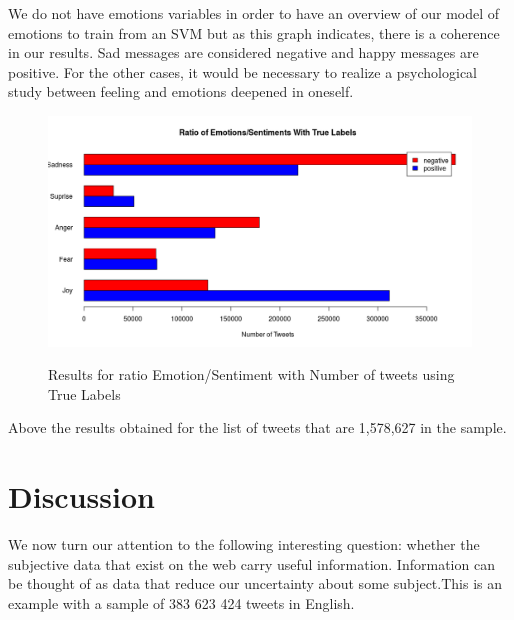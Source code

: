 \documentclass{acmtog} %
\begin{document}
\begin{itemize}
We do not have emotions variables in order to have an overview of our model of emotions to train from an SVM but as this graph indicates, there is a coherence in our results. Sad messages are considered negative and happy messages are positive. For the other cases, it would be necessary to realize a psychological study between feeling and emotions deepened in oneself.


\begin{figure}[h!]
{\includegraphics[width=\linewidth]{ratio-true-labels.png}}
\caption{Results for ratio Emotion/Sentiment with Number of tweets using True Labels}
  \label{fig:contradiction_barplot}
\end{figure}

\begin{table}[H]
\label{tab:cross_tab_TrueLabels}
\end{table}



Above the results obtained for the list of tweets that are 1,578,627 in the sample.


\section{Discussion}
\label{sec:discussion}

We now turn our attention to the following interesting question: whether the subjective data that exist on the web carry useful information. Information can be thought of as data that reduce our uncertainty about some subject.This is an example with a sample of 383 623 424 tweets in English.


\end{itemize}
\end{document}
